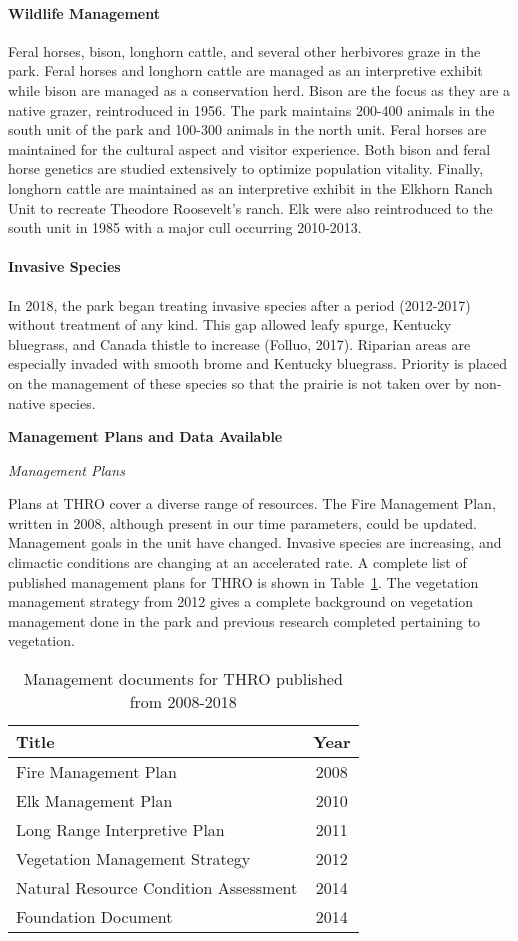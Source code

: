 \paragraph{Wildlife Management} 
Feral horses, bison, longhorn cattle, and several other herbivores graze in the park.
 Feral horses and longhorn cattle are managed as an interpretive exhibit while bison are managed as a conservation herd. 
Bison are the focus as they are a native grazer, reintroduced in 1956. 
The park maintains 200-400 animals in the south unit of the park and 100-300 animals in the north unit. 
Feral horses are maintained for the cultural aspect and visitor experience. 
Both bison and feral horse genetics are studied extensively to optimize population vitality. 
Finally, longhorn cattle are maintained as an interpretive exhibit in the Elkhorn Ranch Unit to recreate Theodore Roosevelt's ranch. 
Elk were also reintroduced to the south unit in 1985 with a major cull occurring 2010-2013.

\paragraph{Invasive Species} 
In 2018, the park began treating invasive species after a period (2012-2017) without treatment of any kind. 
This gap allowed leafy spurge, Kentucky bluegrass, and Canada thistle to increase (Folluo, 2017). 
Riparian areas are especially invaded with smooth brome and Kentucky bluegrass. 
Priority is placed on the management of these species so that the prairie is not taken over by non-native species.

\textbf{Management Plans and Data Available}

\emph{Management Plans}

Plans at THRO cover a diverse range of resources. 
The Fire Management Plan, written in 2008, although present in our time parameters, could be updated. 
Management goals in the unit have changed. 
Invasive species are increasing, and climactic conditions are changing at an accelerated rate. 
A complete list of published management plans for THRO is shown in Table~\ref{tab:THROmandocs}. 
The vegetation management strategy from 2012 gives a complete background on vegetation management done in the park and previous research completed pertaining to vegetation.

\begin{table}[h]
	\centering
\caption[THRO management documents]
	{Management documents for THRO published from 2008-2018}
\label{tab:THROmandocs}
\begin{tabular}{lc}
	\toprule
	Title & Year\tabularnewline
	\midrule
	Fire Management Plan & 2008 \tabularnewline
	Elk Management Plan  & 2010 \tabularnewline
	Long Range Interpretive Plan & 2011 \tabularnewline
	Vegetation Management Strategy & 2012 \tabularnewline
	Natural Resource Condition Assessment & 2014\tabularnewline
	Foundation Document & 2014 \tabularnewline
	\bottomrule
\end{tabular}
\end{table}

